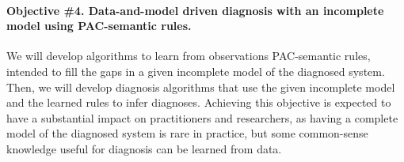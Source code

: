 \documentclass[12pt]{article}
\begin{document}
\vspace{-0.35cm}
\paragraph{Objective \#4. Data-and-model driven diagnosis with an incomplete model using PAC-semantic rules.} 
We will develop algorithms to learn from observations
PAC-semantic rules, intended to fill the gaps in a given incomplete model of the diagnosed system. 
Then, we will develop diagnosis algorithms that use the given incomplete model and the learned rules to infer diagnoses. %
Achieving this objective is expected to have a substantial impact on practitioners and researchers, 
as having a complete model of the diagnosed system is rare in practice, but some common-sense knowledge useful for diagnosis can be learned from data. 






\end{document}
